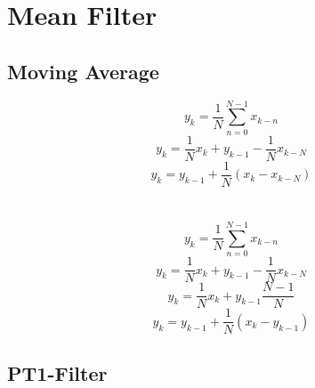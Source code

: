 \documentclass[
    10pt, %
    DIV12,
    english, %
    a5paper, %
    twoside, %
    titlepage, %
    parskip=half, %
    headings=small, %
    listof=totoc, %
    bibliography=totoc, %
    index=totoc, %
    captions=tableheading, %
    final %
]{scrbook}
\begin{document}
\tableofcontents 

\newpage

% 
\chapter{Mean Filter}

\section{Moving Average}

\begin{equation}
y_{k}=\frac{1}{N}\sum_{n=0}^{N-1}x_{k-n}\nonumber
\end{equation}
\begin{equation}
y_{k}=\frac{1}{N}x_k+y_{k-1}-\frac{1}{N}x_{k-N}\nonumber
\end{equation}
\begin{equation}
y_{k}=y_{k-1}+\frac{1}{N}\left(x_{k}-x_{k-N}\right)\nonumber
\end{equation}
\\
\\
\begin{equation}
y_{k}=\frac{1}{N}\sum_{n=0}^{N-1}x_{k-n}\nonumber
\end{equation}
\begin{equation}
y_{k}=\frac{1}{N}x_k+y_{k-1}-\frac{1}{N}x_{k-N}\nonumber
\end{equation}
\begin{equation}
y_{k}=\frac{1}{N}x_k+y_{k-1}\frac{N-1}{N}\nonumber
\end{equation}
\begin{equation}
y_{k}=y_{k-1}+\frac{1}{N}\left(x_{k}-y_{k-1}\right)\nonumber
\end{equation}

\section{PT1-Filter}
\end{document}

